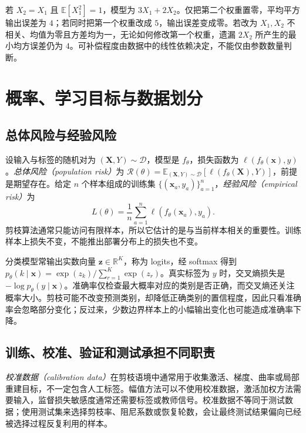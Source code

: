 \documentclass[UTF8,12pt,a4paper,fontset=fandol]{ctexart}
\begin{document}
\begin{example}[相关特征允许补偿]
若 $X_2=X_1$ 且 $\mathbb E[X_1^2]=1$，模型为 $3X_1+2X_2$。仅把第二个权重置零，平均平方输出误差为 $4$；若同时把第一个权重改成 $5$，输出误差变成零。若改为 $X_1,X_2$ 不相关、均值为零且方差均为一，无论如何修改第一个权重，遗漏 $2X_2$ 所产生的最小均方误差仍为 $4$。可补偿程度由数据中的线性依赖决定，不能仅由参数数量判断。
\end{example}

\section{概率、学习目标与数据划分}
\label{sec:prune-learning}

\subsection{总体风险与经验风险}
设输入与标签的随机对为 $(\mathbf X,Y)\sim\mathcal D$，模型是 $f_\theta$，损失函数为 $\ell(f_\theta(\mathbf x),y)$。\emph{总体风险（population risk）}为 $\mathcal R(\theta)=\mathbb E_{(\mathbf X,Y)\sim\mathcal D}[\ell(f_\theta(\mathbf X),Y)]$，前提是期望存在。给定 $n$ 个样本组成的训练集 $\{(\mathbf x_a,y_a)\}_{a=1}^n$，\emph{经验风险（empirical risk）}为
\begin{equation}
 L(\theta)=\frac1n\sum_{a=1}^n\ell(f_\theta(\mathbf x_a),y_a).
 \label{eq:prune-empirical}
\end{equation}
剪枝算法通常只能访问有限样本，所以它估计的是与当前样本相关的重要性。训练样本上损失不变，不能推出部署分布上的损失也不变。

分类模型常输出实数向量 $\mathbf z\in\mathbb R^K$，称为 logits，经 softmax 得到 $p_\theta(k\mid\mathbf x)=\exp(z_k)/\sum_{r=1}^K\exp(z_r)$。真实标签为 $y$ 时，交叉熵损失是 $-\log p_\theta(y\mid\mathbf x)$。准确率仅检查最大概率对应的类别是否正确，而交叉熵还关注概率大小。剪枝可能不改变预测类别，却降低正确类别的置信程度，因此只看准确率会忽略部分变化；反过来，少数边界样本上的小幅输出变化也可能造成准确率下降。

\subsection{训练、校准、验证和测试承担不同职责}
\emph{校准数据（calibration data）}在剪枝语境中通常用于收集激活、梯度、曲率或局部重建目标，不一定包含人工标签。幅值方法可以不使用校准数据，激活加权方法需要输入，监督损失敏感度通常还需要标签或教师信号。校准数据不等同于测试数据；使用测试集来选择剪枝率、阻尼系数或恢复轮数，会让最终测试结果偏向已经被选择过程反复利用的样本。
\end{document}
